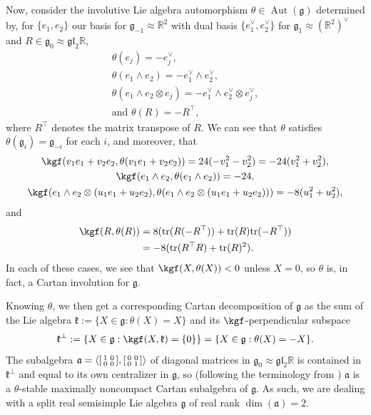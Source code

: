\documentclass[12pt,a4paper]{amsart}
\theoremstyle{definition}
\DeclareMathOperator{\Aut}{Aut}
\newenvironment{smallbmatrix}
  {\left[\begin{smallmatrix}}
  {\end{smallmatrix}\right]}
\begin{document}
\newpage
Now, consider the involutive Lie algebra automorphism $\theta\in\Aut(\mathfrak{g})$ determined by, for $\{e_1,e_2\}$ our basis for $\mathfrak{g}_{-1}\approx\mathbb{R}^2$ with dual basis $\{e_1^\vee,e_2^\vee\}$ for $\mathfrak{g}_1\approx(\mathbb{R}^2)^\vee$ and $R\in\mathfrak{g}_0\approx\mathfrak{gl}_2\mathbb{R}$,
\begin{gather*}\theta(e_j)=-e_j^\vee, \\ \theta(e_1\wedge e_2)=-e_1^\vee\wedge e_2^\vee, \\ \theta(e_1\wedge e_2\otimes e_j)=-e_1^\vee\wedge e_2^\vee\otimes e_j^\vee, \\ \text{and }\theta(R)=-R^\top,\end{gather*}
where $R^\top$ denotes the matrix transpose of $R$. We can see that $\theta$ satisfies $\theta(\mathfrak{g}_i)=\mathfrak{g}_{-i}$ for each $i$, and moreover, that
\begin{gather*}\kgf(v_1e_1+v_2e_2,\theta(v_1e_1+v_2e_2))=24(-v_1^2-v_2^2)=-24(v_1^2+v_2^2), \\ \kgf(e_1\wedge e_2,\theta(e_1\wedge e_2))=-24, \\ \kgf(e_1\wedge e_2\otimes(u_1e_1+u_2e_2),\theta(e_1\wedge e_2\otimes(u_1e_1+u_2e_2)))=-8(u_1^2+u_2^2),\end{gather*}
and
\begin{align*}\kgf(R,\theta(R)) & =8(\mathrm{tr}(R(-R^\top))+\mathrm{tr}(R)\mathrm{tr}(-R^\top)) \\ & =-8(\mathrm{tr}(R^\top R)+\mathrm{tr}(R)^2).\end{align*}
In each of these cases, we see that $\kgf(X,\theta(X))<0$ unless $X=0$, so $\theta$ is, in fact, a Cartan involution for $\mathfrak{g}$.

Knowing $\theta$, we then get a corresponding Cartan decomposition of $\mathfrak{g}$ as the sum of the Lie algebra $\mathfrak{k}:=\{X\in\mathfrak{g}:\theta(X)=X\}$ and its $\kgf$-perpendicular subspace
\[\mathfrak{k}^\perp:=\{X\in\mathfrak{g}:\kgf(X,\mathfrak{k})=\{0\}\}=\{X\in\mathfrak{g}:\theta(X)=-X\}.\]
The subalgebra $\mathfrak{a}=\langle\begin{smallbmatrix}1 & 0 \\ 0 & 0\end{smallbmatrix},\begin{smallbmatrix}0 & 0 \\ 0 & 1\end{smallbmatrix}\rangle$ of diagonal matrices in $\mathfrak{g}_0\approx\mathfrak{gl}_2\mathbb{R}$ is contained in $\mathfrak{k}^\perp$ and equal to its own centralizer in $\mathfrak{g}$, so (following the terminology from \cite{CapSlovakPG1}) $\mathfrak{a}$ is a $\theta$-stable maximally noncompact Cartan subalgebra of $\mathfrak{g}$. As such, we are dealing with a split real semisimple Lie algebra $\mathfrak{g}$ of real rank $\dim(\mathfrak{a})=2$.
\end{document}
